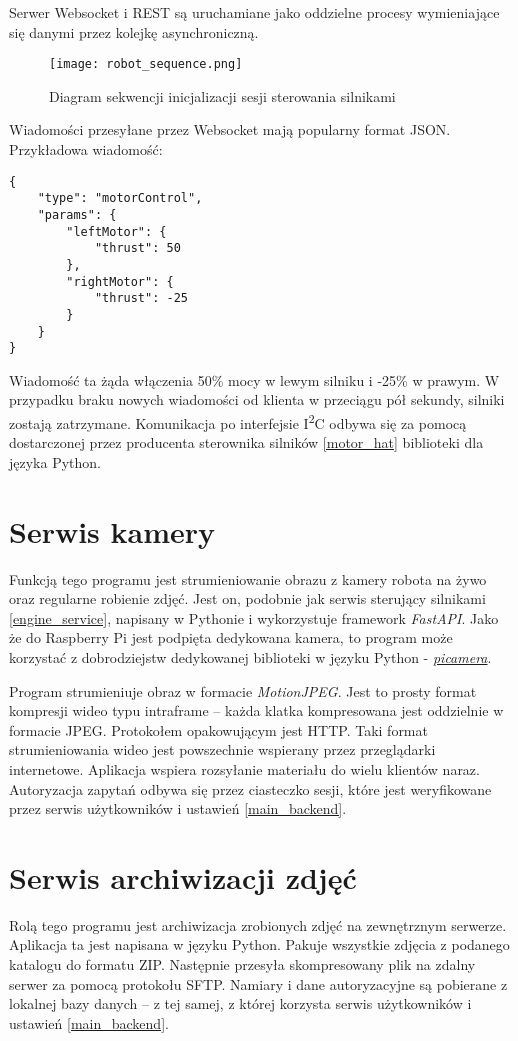 Serwer Websocket i REST są uruchamiane jako oddzielne procesy wymieniające się danymi przez kolejkę asynchroniczną.

\begin{figure}[H]
    \centering \texttt{[image: robot\_sequence.png]}
    \caption{Diagram sekwencji inicjalizacji sesji sterowania silnikami}
    \label{rys:sequence}
\end{figure}

Wiadomości przesyłane przez Websocket mają popularny format JSON.
Przykładowa wiadomość:
\begin{verbatim}
{
    "type": "motorControl",
    "params": {
        "leftMotor": {
            "thrust": 50
        },
        "rightMotor": {
            "thrust": -25
        }
    }
}
\end{verbatim}
Wiadomość ta żąda włączenia 50\% mocy w lewym silniku i -25\% w prawym.
W przypadku braku nowych wiadomości od klienta w przeciągu pół sekundy, silniki zostają zatrzymane.
Komunikacja po interfejsie I\textsuperscript{2}C odbywa się za pomocą dostarczonej przez producenta sterownika silników \ref{motor_hat} biblioteki dla języka Python.

\section{Serwis kamery}
Funkcją tego programu jest strumieniowanie obrazu z kamery robota na żywo oraz regularne robienie zdjęć.
Jest on, podobnie jak serwis sterujący silnikami \ref{engine_service}, napisany w Pythonie i wykorzystuje framework \textit{FastAPI}.
Jako że do Raspberry Pi jest podpięta dedykowana kamera, to program może korzystać z dobrodziejstw dedykowanej biblioteki w języku Python - \href{https://picamera.readthedocs.io/en/release-1.13/#}{\textit{picamera}}.

Program strumieniuje obraz w formacie \textit{MotionJPEG}.
Jest to prosty format kompresji wideo typu intraframe -- każda klatka kompresowana jest oddzielnie w formacie JPEG.
Protokołem opakowującym jest HTTP.
Taki format strumieniowania wideo jest powszechnie wspierany przez przeglądarki internetowe.
Aplikacja wspiera rozsyłanie materiału do wielu klientów naraz.
Autoryzacja zapytań odbywa się przez ciasteczko sesji, które jest weryfikowane przez serwis użytkowników i ustawień \ref{main_backend}.

\section{Serwis archiwizacji zdjęć}
Rolą tego programu jest archiwizacja zrobionych zdjęć na zewnętrznym serwerze.
Aplikacja ta jest napisana w języku Python.
Pakuje wszystkie zdjęcia z podanego katalogu do formatu ZIP.
Następnie przesyła skompresowany plik na zdalny serwer za pomocą protokołu SFTP.
Namiary i dane autoryzacyjne są pobierane z lokalnej bazy danych -- z tej samej, z której korzysta serwis użytkowników i ustawień \ref{main_backend}.

